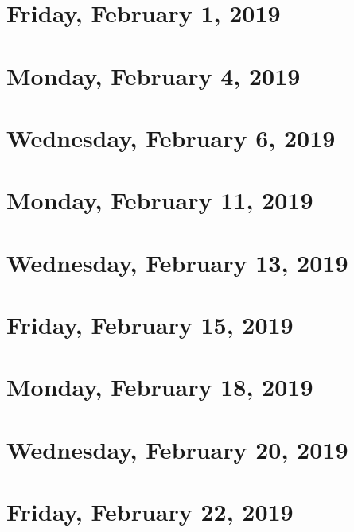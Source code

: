 \documentclass[reqno]{amsart}
\begin{document}
\section{Friday, February 1, 2019}    
    

\section{Monday, February 4, 2019}
    

\section{Wednesday, February 6, 2019}
    

\section{Monday, February 11, 2019}
    

\section{Wednesday, February 13, 2019}
    
    
\section{Friday, February 15, 2019}
    
    
\section{Monday, February 18, 2019}
    

\section{Wednesday, February 20, 2019}
    
    
\section{Friday, February 22, 2019}
    
\end{document}
